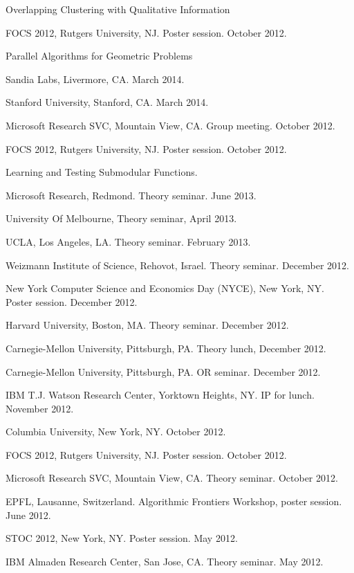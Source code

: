 \documentclass[11pt]{article}
\newenvironment{innerlist}[1][\enskip\textbullet]%
        {\begin{compactitem}[#1]}{\end{compactitem}}
\begin{document}
\begin{innerlist}
\item Overlapping Clustering with Qualitative Information
\begin{innerlist}
\item FOCS 2012, Rutgers University, NJ. Poster session. October 2012.
\end{innerlist}

\item Parallel Algorithms for Geometric Problems
\begin{innerlist}
\item Sandia Labs, Livermore, CA. March 2014.
\item Stanford University, Stanford, CA. March 2014.
\item Microsoft Research SVC, Mountain View, CA. Group meeting. October 2012.
\item FOCS 2012, Rutgers University, NJ. Poster session. October 2012.
\end{innerlist}

\item Learning and Testing Submodular Functions.
\begin{innerlist}
  \item Microsoft Research, Redmond. Theory seminar. June 2013.
  \item University Of Melbourne, Theory seminar, April 2013.
  \item UCLA, Los Angeles, LA. Theory seminar. February 2013.
  \item Weizmann Institute of Science, Rehovot, Israel. Theory seminar. December 2012.  
  \item New York Computer Science and Economics Day (NYCE), New York, NY. Poster session. December 2012.  
  \item Harvard University, Boston, MA. Theory seminar. December 2012.
  \item Carnegie-Mellon University, Pittsburgh, PA. Theory lunch, December 2012.
  \item Carnegie-Mellon University, Pittsburgh, PA. OR seminar. December 2012.
  \item IBM T.J. Watson Research Center, Yorktown Heights, NY. IP for lunch. November 2012.
  \item Columbia University, New York, NY. October 2012.
  \item FOCS 2012, Rutgers University, NJ. Poster session. October 2012.
  \item Microsoft Research SVC, Mountain View, CA. Theory seminar. October 2012.
  \item EPFL, Lausanne, Switzerland. Algorithmic Frontiers Workshop, poster session. June 2012.
  \item STOC 2012, New York, NY. Poster session. May 2012.
  \item IBM Almaden Research Center, San Jose, CA. Theory seminar. May 2012.
\end{innerlist}


\end{innerlist}
\end{document}
